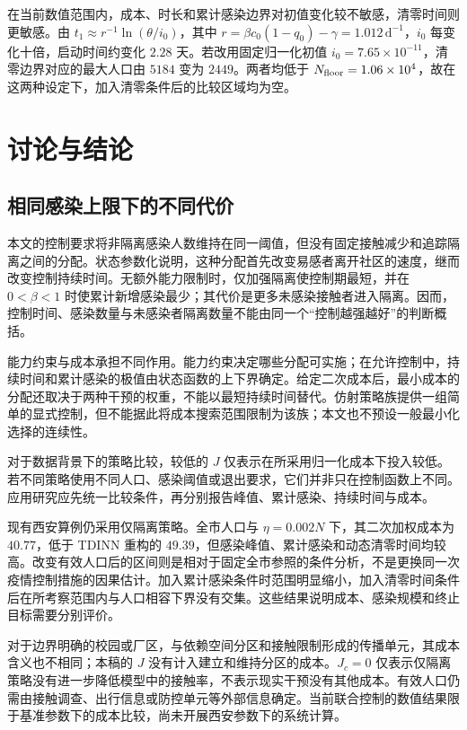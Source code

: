 \documentclass[lang=cn,a4paper,newtx]{elegantpaper}
\numberwithin{equation}{section}
\theoremstyle{plain}
\begin{document}
在当前数值范围内，成本、时长和累计感染边界对初值变化较不敏感，清零时间则更敏感。由 $t_1\approx r^{-1}\ln(\theta/i_0)$，其中 $r=\beta c_0(1-q_0)-\gamma=1.012\,\mathrm{d}^{-1}$，$i_0$ 每变化十倍，启动时间约变化 $2.28$ 天。若改用固定归一化初值 $i_0=7.65\times10^{-11}$，清零边界对应的最大人口由 $5184$ 变为 $2449$。两者均低于 $N_{\rm floor}=1.06\times10^4$，故在这两种设定下，加入清零条件后的比较区域均为空。


\FloatBarrier

\section{讨论与结论}
\label{sec:discussion}
\subsection{相同感染上限下的不同代价}
本文的控制要求将非隔离感染人数维持在同一阈值，但没有固定接触减少和追踪隔离之间的分配。状态参数化说明，这种分配首先改变易感者离开社区的速度，继而改变控制持续时间。无额外能力限制时，仅加强隔离使控制期最短，并在 $0<\beta<1$ 时使累计新增感染最少；其代价是更多未感染接触者进入隔离。因而，控制时间、感染数量与未感染者隔离数量不能由同一个“控制越强越好”的判断概括。

能力约束与成本承担不同作用。能力约束决定哪些分配可实施；在允许控制中，持续时间和累计感染的极值由状态函数的上下界确定。给定二次成本后，最小成本的分配还取决于两种干预的权重，不能以最短持续时间替代。仿射策略族提供一组简单的显式控制，但不能据此将成本搜索范围限制为该族；本文也不预设一般最小化选择的连续性。

对于数据背景下的策略比较，较低的 $J$ 仅表示在所采用归一化成本下投入较低。若不同策略使用不同人口、感染阈值或退出要求，它们并非只在控制函数上不同。应用研究应先统一比较条件，再分别报告峰值、累计感染、持续时间与成本。

现有西安算例仍采用仅隔离策略。全市人口与 $\eta=0.002N$ 下，其二次加权成本为 $40.77$，低于 TDINN 重构的 $49.39$，但感染峰值、累计感染和动态清零时间均较高。改变有效人口后的区间则是相对于固定全市参照的条件分析，不是更换同一次疫情控制措施的因果估计。加入累计感染条件时范围明显缩小，加入清零时间条件后在所考察范围内与人口相容下界没有交集。这些结果说明成本、感染规模和终止目标需要分别评价。

对于边界明确的校园或厂区，与依赖空间分区和接触限制形成的传播单元，其成本含义也不相同；本稿的 $J$ 没有计入建立和维持分区的成本。$J_c=0$ 仅表示仅隔离策略没有进一步降低模型中的接触率，不表示现实干预没有其他成本。有效人口仍需由接触调查、出行信息或防控单元等外部信息确定。当前联合控制的数值结果限于基准参数下的成本比较，尚未开展西安参数下的系统计算。
\end{document}
